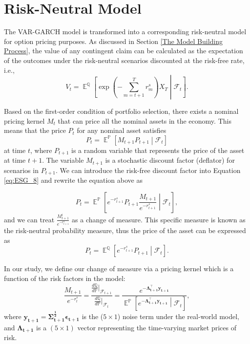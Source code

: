 \documentclass{sfuthesis}
\DeclareMathOperator{\E}{\mathbb{E}}
\numberwithin{equation}{chapter}
\begin{document}
	
	
	\section{Risk-Neutral Model} 
	\label{Risk-Neutral Model}
	
		\justify
		The VAR-GARCH model is transformed into a corresponding risk-neutral model for option pricing purposes. As discussed in Section \ref{The Model Building Process}, the value of any contingent claim can be calculated as the expectation of the outcomes under the risk-neutral scenarios discounted at the risk-free rate, i.e.,
		\begin{equation}
		\label{eq:ESG_8}
		V_t = \E^{\mathbb{Q}}\left[\exp\left({-\sum_{m=t+1}^{T}r_m^{s}}\right)X_T\middle|\mathcal{F}_t\right].
		\end{equation}
	
	
		\justify
		Based on the first-order condition of portfolio selection, there exists a nominal pricing kernel $M_t$ that can price all the nominal assets in the economy. This means that the price $P_t$ for any nominal asset satisfies
		\begin{equation}
		\label{eq:ESG_9}
		P_t = \E^{\mathbb{P}}\left[M_{t+1}P_{t+1}\middle|\mathcal{F}_t\right]
		\end{equation}
		at time $t$, where $P_{t+1}$ is a random variable that represents the price of the asset at time $t+1$. The variable $M_{t+1}$ is a stochastic discount factor (deflator) for scenarios in $P_{t+1}$. We can introduce the risk-free discount factor into Equation \eqref{eq:ESG_8} and rewrite the equation above as
		
		\begin{equation}
		\label{eq:ESG_10}
		P_t  
		=\E^{\mathbb{P}}\left[e^{-r_{t+1}^s}P_{t+1}\frac{M_{t+1}}{e^{-r_{t+1}^s}}\middle|\mathcal{F}_t\right],
		\end{equation}
		and we can treat $\frac{M_{t+1}^{i}}{e^{-r_{t+1}^s}}$ as a change of measure. This specific measure is known as the risk-neutral probability measure, thus the price of the asset can be expressed as 
		\begin{equation}
		\label{eq:ESG_11}
		P_t =\E^{\mathbb{Q}}\left[e^{-r_{t+1}^s}P_{t+1}\middle|\mathcal{F}_t\right].
		\end{equation}
	
	
		\justify
		In our study, we define our change of measure via a pricing kernel which is a function of the risk factors in the model:
		\begin{equation}
		\label{eq:ESG_12}
		\frac{M_{t+1}}{e^{-r_t^s}} =
		\frac{\frac{d\mathbb{Q}}{d\mathbb{P}}\big|_{\mathcal{F}_{t+1}}}{\frac{d\mathbb{Q}}{d\mathbb{P}}\big|_{\mathcal{F}_{t}}} = \frac{e^{\boldsymbol{-\Lambda^\top_{t+1} y_{t+1}}}}
		{\E^{\mathbb{P}}\left[e^{\boldsymbol{-\Lambda^\top_{t+1} y_{t+1}}}\middle|\mathcal{F}_{t}\right]},
		\end{equation}
		where $\boldsymbol{y_{t+1} = \Sigma_{t+1}^{\frac{1}{2}}\epsilon_{t+1}}$ is the ($5 \times 1$) noise term under the real-world model, and $\boldsymbol{\Lambda_{t+1}}$ is a $(5\times 1)$ vector representing the time-varying market prices of risk. 
	
\end{document}
